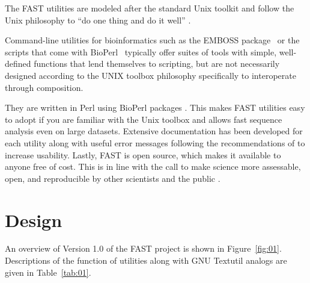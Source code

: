 \documentclass{frontiersSCNS} %
\begin{document}
The FAST utilities are modeled after the standard Unix
toolkit\citep{Peek2001} and follow the Unix philosophy to ``do one
thing and do it well'' \citep{Stutz2000}.


Command-line utilities for bioinformatics such as the EMBOSS
package~\citep{Rice2000} or the scripts that come with
BioPerl~\citep{Stajich2002} typically offer suites of tools with
simple, well-defined functions that lend themselves to scripting, but
are not necessarily designed according to the UNIX toolbox philosophy specifically to interoperate through
composition.

 They are written in Perl
using BioPerl packages \citep{Stajich2002}. This makes FAST utilities
easy to adopt if you are familiar with the Unix toolbox and allows
fast sequence analysis even on large datasets. Extensive
documentation has been developed for each utility along with useful
error messages following the recommendations of \citep{Seemann2013} to
increase usability. Lastly, FAST is open source, which makes it
available to anyone free of cost. This is in line with the call to
make science more assessable, open, and reproducible by other
scientists and the public \citep{Groves2012}.

\section{Design}

An overview of Version 1.0 of the FAST project is shown in
Figure~\ref{fig:01}. Descriptions of the function of utilities along
with GNU Textutil analogs are given in Table~\ref{tab:01}.
\end{document}
